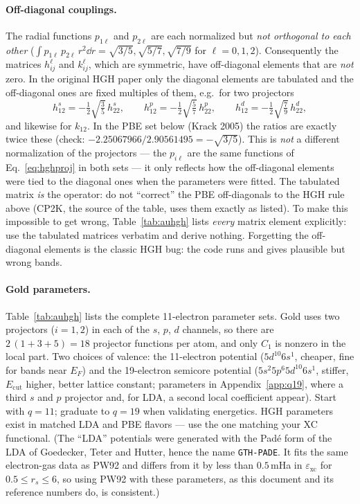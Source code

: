 \paragraph{Off-diagonal couplings.} The radial functions $p_{1\ell}$ and
$p_{2\ell}$ are each normalized but \emph{not orthogonal to each other}
($\int p_{1\ell}\,p_{2\ell}\, r^2 \dd r = \sqrt{3/5}, \sqrt{5/7}, \sqrt{7/9}$
for $\ell = 0,1,2$). Consequently the matrices $h^\ell_{ij}$ and
$k^\ell_{ij}$, which are symmetric, have off-diagonal elements that are
\emph{not} zero. In the original HGH paper only the diagonal elements are
tabulated and the off-diagonal ones are fixed multiples of them, e.g.\ for
two projectors
\begin{equation}
h^{s}_{12} = -\tfrac12\sqrt{\tfrac35}\, h^{s}_{22},
\qquad
h^{p}_{12} = -\tfrac12\sqrt{\tfrac57}\, h^{p}_{22},
\qquad
h^{d}_{12} = -\tfrac12\sqrt{\tfrac79}\, h^{d}_{22},
\label{eq:hghoffdiag}
\end{equation}
and likewise for $k_{12}$. In the PBE set below (Krack 2005) the ratios
are exactly twice these (check: $-2.25067966/2.90561495 = -\sqrt{3/5}$).
This is \emph{not} a different normalization of the projectors --- the
$p_{i\ell}$ are the same functions of Eq.~\eqref{eq:hghproj} in both sets
--- it only reflects how the off-diagonal elements were tied to the
diagonal ones when the parameters were fitted. The tabulated matrix
\emph{is} the operator: do not ``correct'' the PBE off-diagonals to the
HGH rule above (CP2K, the source of the table, uses them exactly as
listed). To make this impossible to get wrong,
Table~\ref{tab:auhgh} lists \emph{every} matrix element explicitly: use
the tabulated matrices verbatim and derive nothing. Forgetting the
off-diagonal elements is the classic HGH bug: the code runs and gives
plausible but wrong bands.

\paragraph{Gold parameters.} Table~\ref{tab:auhgh} lists the complete
11-electron parameter sets. Gold uses two projectors ($i = 1,2$) in each of
the $s$, $p$, $d$ channels, so there are $2\,(1+3+5) = 18$ projector
functions per atom, and only $C_1$ is nonzero in the local part. Two
choices of valence: the 11-electron potential ($5d^{10}6s^1$, cheaper, fine for bands
near $E_F$) and the 19-electron semicore potential
($5s^2 5p^6 5d^{10} 6s^1$, stiffer, $E_{\mathrm{cut}}$ higher, better lattice
constant; parameters in Appendix~\ref{app:q19}, where a third $s$ and $p$
projector and, for LDA, a second local coefficient appear). Start with $q=11$;
graduate to $q=19$ when validating energetics.
HGH parameters exist in matched LDA and PBE flavors --- use the one matching
your XC functional. (The ``LDA'' potentials were generated with the
Pad\'e form of the LDA of Goedecker, Teter and Hutter, hence the name
\texttt{GTH-PADE}. It fits the same electron-gas data as PW92 and differs
from it by less than $0.5$\,mHa in $\varepsilon_{\mathrm{xc}}$ for
$0.5 \le r_s \le 6$, so using PW92 with these parameters, as this document
and its reference numbers do, is consistent.)

